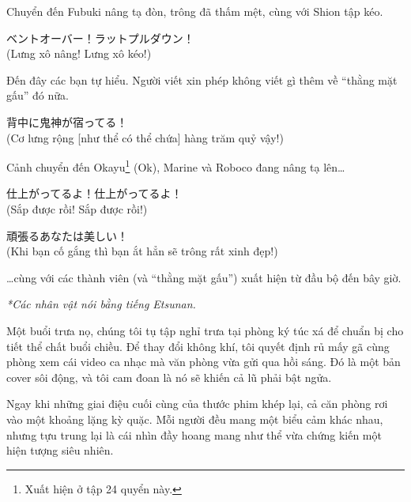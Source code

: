 \documentclass[../main.tex]{subfiles}
\begin{document}
Chuyển đến Fubuki nâng tạ đòn, trông đã thấm mệt, cùng với Shion tập kéo.

\begin{dialogue}
   ベントオーバー！ラットプルダウン！\\(Lưng xô nâng! Lưng xô kéo!)
\end{dialogue}

Đến đây các bạn tự hiểu. Người viết xin phép không viết gì thêm về ``thằng mặt gấu'' đó nữa.

\begin{dialogue}
   背中に鬼神が宿ってる！\\(Cơ lưng rộng [như thể có thể chứa] hàng trăm quỷ vậy!)
\end{dialogue}

Cảnh chuyển đến Okayu\footnote{Xuất hiện ở tập 24 quyển này.} (Ok), Marine và Roboco đang nâng tạ lên\dots

\begin{dialogue}
   仕上がってるよ！仕上がってるよ！\\(Sắp được rồi! Sắp được rồi!)
\end{dialogue}

\begin{dialogue}
   頑張るあなたは美しい！\\(Khi bạn cố gắng thì bạn ắt hẳn sẽ trông rất xinh đẹp!)
\end{dialogue}


\dots cùng với các thành viên (và ``thằng mặt gấu'') xuất hiện từ đầu bộ đến bây giờ.
\omk

\begin{center}
  {\textit{*Các nhân vật nói bằng tiếng Etsunan.}}
\end{center}


Một buổi trưa nọ, chúng tôi tụ tập nghỉ trưa tại phòng ký túc xá để chuẩn bị cho tiết thể chất buổi chiều. Để thay đổi không khí, tôi quyết định rủ mấy gã cùng phòng xem cái video ca nhạc mà văn phòng vừa gửi qua hồi sáng. Đó là một bản cover sôi động, và tôi cam đoan là nó sẽ khiến cả lũ phải bật ngửa.

Ngay khi những giai điệu cuối cùng của thước phim khép lại, cả căn phòng rơi vào một khoảng lặng kỳ quặc. Mỗi người đều mang một biểu cảm khác nhau, nhưng tựu trung lại là cái nhìn đầy hoang mang như thể vừa chứng kiến một hiện tượng siêu nhiên.
\end{document}
